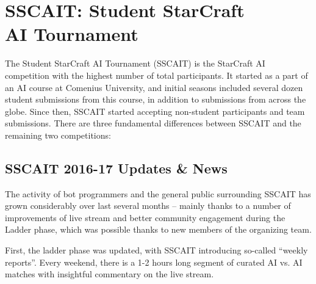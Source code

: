 \section{SSCAIT: Student StarCraft\\ AI Tournament}\label{subsecSSCAIT}

The Student StarCraft AI Tournament (SSCAIT) is the StarCraft AI competition with the highest number of total participants. It started as a part of an AI course at Comenius University, and initial seasons included several dozen student submissions from this course, in addition to submissions from across the globe. Since then, SSCAIT started accepting non-student participants and team submissions. There are three fundamental differences between SSCAIT and the remaining two competitions:

\subsection*{SSCAIT 2016-17 Updates \& News}\label{subsecSSCAITnews}

The activity of bot programmers and the general public surrounding SSCAIT has grown considerably over last several months -- mainly thanks to a number of improvements of live stream and better community engagement during the Ladder phase, which was possible thanks to new members of the organizing team.

First, the ladder phase was updated, with SSCAIT introducing so-called ``weekly reports''. Every weekend, there is a 1-2 hours long segment of curated AI vs. AI matches with insightful commentary on the live stream.  

